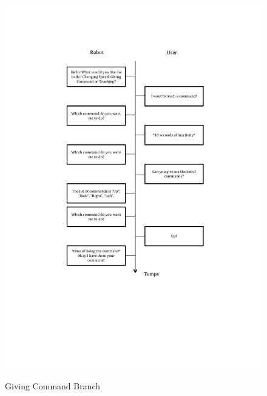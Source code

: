 \begin{figure}
\begin{center}
\includegraphics[width=16cm]{img/Schema_Dialogue_CommandingBranch.pdf}\\
\caption{Giving Command Branch}
\end{center}
\end{figure}

